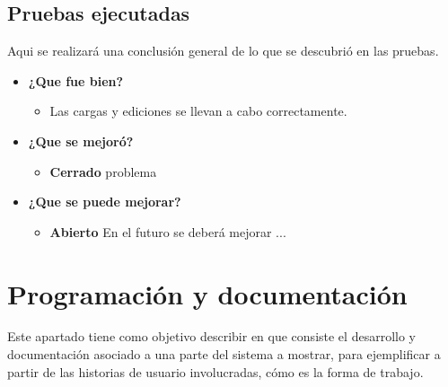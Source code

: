 \documentclass[a4paper,12pt]{article}
\begin{document}
\subsection{Pruebas ejecutadas}
Aqui se realizará una conclusión general de lo que se descubrió en las pruebas.
	\begin{itemize}
		\item \textbf{¿Que fue bien?}
        	\begin{itemize}
				\item        Las cargas y ediciones se llevan a cabo correctamente.
			\end{itemize}

   		\item \textbf{¿Que se mejoró?}
        	\begin{itemize}
                \item \textbf{Cerrado} problema
			\end{itemize}

   		\item \textbf{¿Que se puede mejorar?}
        	\begin{itemize}
		        \item \textbf{Abierto} En el futuro se deberá mejorar ...
            \end{itemize}
        

	\end{itemize}











\section{Programación y documentación}
Este apartado tiene como objetivo describir en que consiste el desarrollo y documentación asociado a una parte del sistema a mostrar, para ejemplificar a partir de las historias de usuario involucradas, cómo es la forma de trabajo.
	
\end{document}
